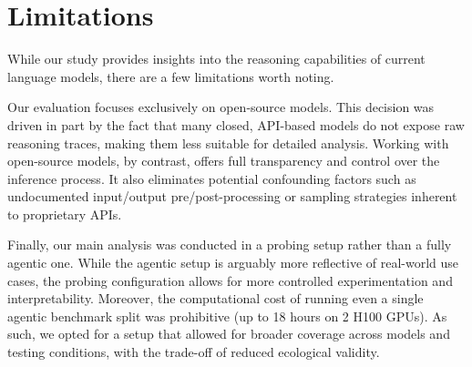 \section*{Limitations}

While our study provides insights into the reasoning capabilities of current language models, there are a few limitations worth noting.

Our evaluation focuses exclusively on open-source models. This decision was driven in part by the fact that many closed, API-based models do not expose raw reasoning traces, making them less suitable for detailed analysis. Working with open-source models, by contrast, offers full transparency and control over the inference process. It also eliminates potential confounding factors such as undocumented input/output pre/post-processing or sampling strategies inherent to proprietary APIs.

Finally, our main analysis was conducted in a probing setup rather than a fully agentic one. While the agentic setup is arguably more reflective of real-world use cases, the probing configuration allows for more controlled experimentation and interpretability. Moreover, the computational cost of running even a single agentic benchmark split was prohibitive (up to 18 hours on 2 H100 GPUs). As such, we opted for a setup that allowed for broader coverage across models and testing conditions, with the trade-off of reduced ecological validity.